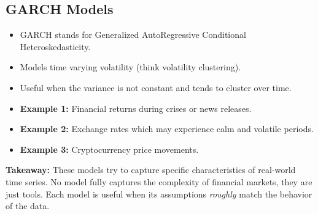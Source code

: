 \documentclass[10pt]{article}
\begin{document}
\subsection*{GARCH Models}
\begin{itemize}
	\item GARCH stands for Generalized AutoRegressive Conditional Heteroskedasticity.
	\item Models time varying volatility (think volatility clustering).
	\item Useful when the variance is not constant and tends to cluster over time.
	\item \textbf{Example 1:} Financial returns during crises or news releases.
	\item \textbf{Example 2:} Exchange rates which may experience calm and volatile periods.
	\item \textbf{Example 3:} Cryptocurrency price movements.
\end{itemize}

\textbf{Takeaway:} These models try to capture specific characteristics of real-world time series. No model fully captures the complexity of financial markets, they are just tools. Each model is useful when its assumptions \emph{roughly} match the behavior of the data.
	
\end{document}
